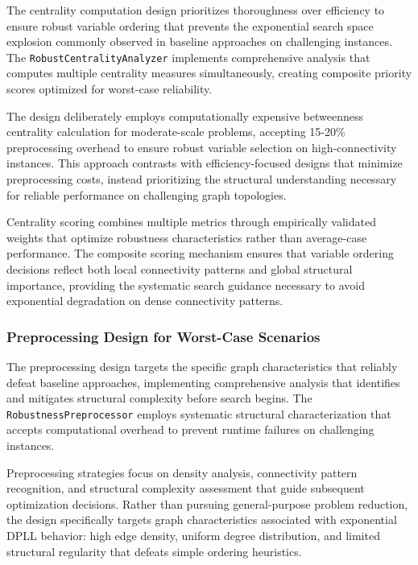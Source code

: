 The centrality computation design prioritizes thoroughness over efficiency to ensure robust variable ordering that prevents the exponential search space explosion commonly observed in baseline approaches on challenging instances. The \texttt{RobustCentrality\-Analyzer} implements comprehensive analysis that computes multiple centrality measures simultaneously, creating composite priority scores optimized for worst-case reliability.

The design deliberately employs computationally expensive betweenness centrality calculation for moderate-scale problems, accepting 15-20\% preprocessing overhead to ensure robust variable selection on high-connectivity instances. This approach contrasts with efficiency-focused designs that minimize preprocessing costs, instead prioritizing the structural understanding necessary for reliable performance on challenging graph topologies.

Centrality scoring combines multiple metrics through empirically validated weights that optimize robustness characteristics rather than average-case performance. The composite scoring mechanism ensures that variable ordering decisions reflect both local connectivity patterns and global structural importance, providing the systematic search guidance necessary to avoid exponential degradation on dense connectivity patterns.

\subsubsection{Preprocessing Design for Worst-Case Scenarios}

The preprocessing design targets the specific graph characteristics that reliably defeat baseline approaches, implementing comprehensive analysis that identifies and mitigates structural complexity before search begins. The \texttt{RobustnessPreprocessor} employs systematic structural characterization that accepts computational overhead to prevent runtime failures on challenging instances.

Preprocessing strategies focus on density analysis, connectivity pattern recognition, and structural complexity assessment that guide subsequent optimization decisions. Rather than pursuing general-purpose problem reduction, the design specifically targets graph characteristics associated with exponential DPLL behavior: high edge density, uniform degree distribution, and limited structural regularity that defeats simple ordering heuristics.

